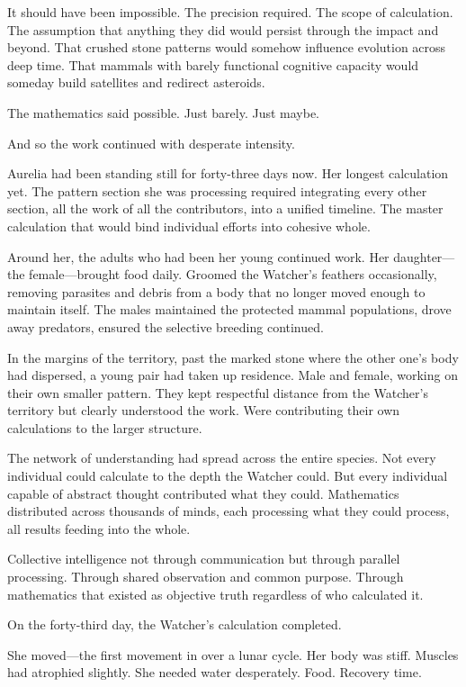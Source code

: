 It should have been impossible. The precision required. The scope of calculation. The assumption that anything they did would persist through the impact and beyond. That crushed stone patterns would somehow influence evolution across deep time. That mammals with barely functional cognitive capacity would someday build satellites and redirect asteroids.

The mathematics said possible. Just barely. Just maybe.

And so the work continued with desperate intensity.

\scenebreak

Aurelia had been standing still for forty-three days now. Her longest calculation yet. The pattern section she was processing required integrating every other section, all the work of all the contributors, into a unified timeline. The master calculation that would bind individual efforts into cohesive whole.

Around her, the adults who had been her young continued work. Her daughter—the female—brought food daily. Groomed the Watcher's feathers occasionally, removing parasites and debris from a body that no longer moved enough to maintain itself. The males maintained the protected mammal populations, drove away predators, ensured the selective breeding continued.

In the margins of the territory, past the marked stone where the other one's body had dispersed, a young pair had taken up residence. Male and female, working on their own smaller pattern. They kept respectful distance from the Watcher's territory but clearly understood the work. Were contributing their own calculations to the larger structure.

The network of understanding had spread across the entire species. Not every individual could calculate to the depth the Watcher could. But every individual capable of abstract thought contributed what they could. Mathematics distributed across thousands of minds, each processing what they could process, all results feeding into the whole.

Collective intelligence not through communication but through parallel processing. Through shared observation and common purpose. Through mathematics that existed as objective truth regardless of who calculated it.

On the forty-third day, the Watcher's calculation completed.

She moved—the first movement in over a lunar cycle. Her body was stiff. Muscles had atrophied slightly. She needed water desperately. Food. Recovery time.

